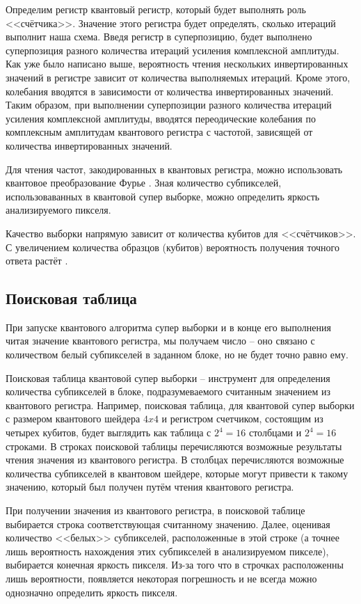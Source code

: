 Определим регистр квантовый регистр, который будет выполнять роль <<счётчика>>. Значение этого регистра будет определять, сколько итераций выполнит наша схема. Введя регистр в суперпозицию, будет выполнено суперпозиция разного количества итераций усиления комплексной амплитуды. Как уже было написано выше, вероятность чтения нескольких инвертированных значений в регистре зависит от количества выполняемых итераций. Кроме этого, колебания вводятся в зависимости от количества инвертированных значений. Таким образом, при выполнении суперпозиции разного количества итераций усиления комплексной амплитуды, вводятся переодические колебания по комплексным амплитудам квантового регистра с частотой, зависящей от количества инвертированных значений.

Для чтения частот, закодированных в квантовых регистра, можно использовать квантовое преобразование Фурье \cite{PQC}. Зная количество субпикселей, использоваванных в квантовой супер выборке, можно определить яркость анализируемого пикселя.

Качество выборки напрямую зависит от количества кубитов для <<счётчиков>>. С увеличением количества образцов (кубитов) вероятность получения точного ответа растёт \cite{PQC}.

\subsection{Поисковая таблица}

При запуске квантового алгоритма супер выборки и в конце его выполнения читая значение квантового регистра, мы получаем число -- оно связано с количеством белый субпикселей в заданном блоке, но не будет точно равно ему. 

Поисковая таблица квантовой супер выборки -- инструмент для определения количества субпикселей в блоке, подразумеваемого считанным значением из квантового регистра. Например, поисковая таблица, для квантовой супер выборки с размером квантового шейдера $4x4$ и регистром счетчиком, состоящим из четырех кубитов, будет выглядить как таблица с $2^4 = 16$ столбцами и $2^4 = 16$ строками. В строках поисковой таблицы перечисляются возможные результаты чтения значения из квантового регистра. В столбцах перечисляются возможные количества  субпикселей в квантовом шейдере, которые могут привести к такому значению, который был получен путём чтения квантового регистра.

При получении значения из квантового регистра, в поисковой таблице выбирается строка соответствующая считанному значению. Далее, оценивая количество <<белых>> субпикселей, расположенные в этой строке (а точнее лишь вероятность нахождения этих субпикселей в анализируемом пикселе), выбирается конечная яркость пикселя. Из-за того что в строчках расположенны лишь вероятности, появляется некоторая погрешность и не всегда можно  однозначно определить яркость пикселя.


